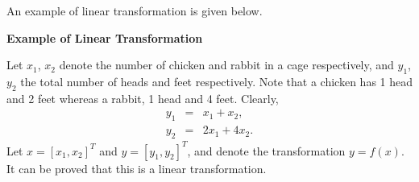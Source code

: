 An example of linear transformation is given below.

\begin{mdframed}
\noindent \textbf{Example of Linear Transformation}

Let $x_1$, $x_2$ denote the number of chicken and rabbit in a cage respectively, and $y_1$, $y_2$ the total number of heads and feet respectively. Note that a chicken has 1 head and 2 feet whereas a rabbit, 1 head and 4 feet. Clearly,
\begin{subequations}\label{eq:nutshell-cage}
\begin{eqnarray}
  y_1 &=& x_1 + x_2, \label{eq:nutshell-cage-1} \\
  y_2 &=& 2x_1 + 4x_2. \label{eq:nutshell-cage-2}
\end{eqnarray}
\end{subequations}
Let $x = [x_1, x_2]^T$ and $y = [y_1, y_2]^T$, and denote the transformation $y = f(x)$. It can be proved that this is a linear transformation. 

\end{mdframed}

